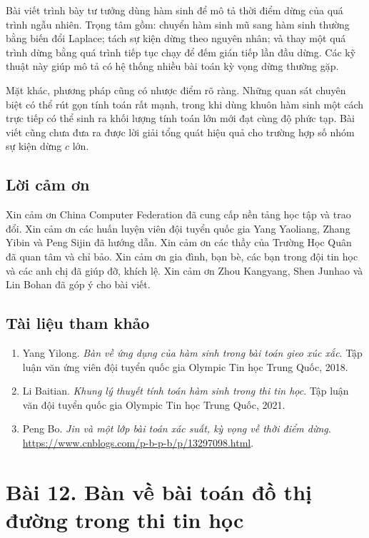 \documentclass[11pt]{article}
\begin{document}
Bài viết trình bày tư tưởng dùng hàm sinh để mô tả thời điểm dừng của quá trình
ngẫu nhiên. Trọng tâm gồm: chuyển hàm sinh mũ sang hàm sinh thường bằng biến
đổi Laplace; tách sự kiện dừng theo nguyên nhân; và thay một quá trình dừng
bằng quá trình tiếp tục chạy để đếm gián tiếp lần đầu dừng. Các kỹ thuật này
giúp mô tả có hệ thống nhiều bài toán kỳ vọng dừng thường gặp.

Mặt khác, phương pháp cũng có nhược điểm rõ ràng. Những quan sát chuyên biệt có
thể rút gọn tính toán rất mạnh, trong khi dùng khuôn hàm sinh một cách trực
tiếp có thể sinh ra khối lượng tính toán lớn mới đạt cùng độ phức tạp. Bài viết
cũng chưa đưa ra được lời giải tổng quát hiệu quả cho trường hợp số nhóm sự
kiện dừng \(c\) lớn.

\subsection*{Lời cảm ơn}

Xin cảm ơn China Computer Federation đã cung cấp nền tảng học tập và trao đổi.
Xin cảm ơn các huấn luyện viên đội tuyển quốc gia Yang Yaoliang, Zhang Yibin và
Peng Sijin đã hướng dẫn. Xin cảm ơn các thầy của Trường Học Quân đã quan tâm
và chỉ bảo. Xin cảm ơn gia đình, bạn bè, các bạn trong đội tin học và các anh
chị đã giúp đỡ, khích lệ. Xin cảm ơn Zhou Kangyang, Shen Junhao và Lin Bohan đã
góp ý cho bài viết.

\subsection*{Tài liệu tham khảo}

\begin{enumerate}
  \item Yang Yilong. \emph{Bàn về ứng dụng của hàm sinh trong bài toán gieo xúc
  xắc}. Tập luận văn ứng viên đội tuyển quốc gia Olympic Tin học Trung Quốc,
  2018.
  \item Li Baitian. \emph{Khung lý thuyết tính toán hàm sinh trong thi tin học}.
  Tập luận văn đội tuyển quốc gia Olympic Tin học Trung Quốc, 2021.
  \item Peng Bo. \emph{Jin và một lớp bài toán xác suất, kỳ vọng về thời điểm
  dừng}. \url{https://www.cnblogs.com/p-b-p-b/p/13297098.html}.
\end{enumerate}

\section*{Bài 12. Bàn về bài toán đồ thị đường trong thi tin học}
\end{document}
